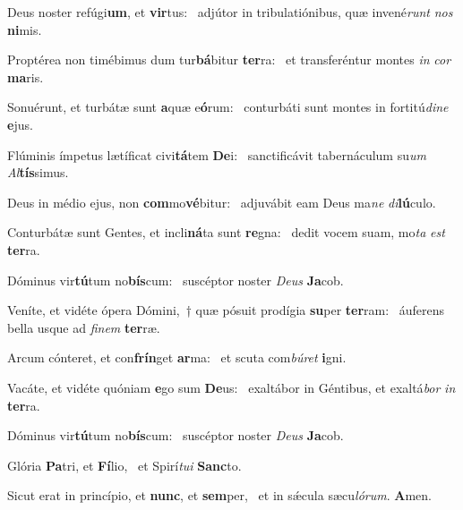 \item Deus noster refúgi\textbf{um}, et \textbf{vir}tus:~\psstar{} adjútor in tribulatiónibus, quæ invené\textit{runt} \textit{nos} \textbf{ni}mis.
\item Proptérea non timébimus dum tur\textbf{bá}bitur \textbf{ter}ra:~\psstar{} et transferéntur montes \textit{in} \textit{cor} \textbf{ma}ris.
\item Sonuérunt, et turbátæ sunt \textbf{a}quæ e\textbf{ó}rum:~\psstar{} conturbáti sunt montes in fortitú\textit{dine} \textbf{e}jus.
\item Flúminis ímpetus lætíficat civi\textbf{tá}tem \textbf{De}i:~\psstar{} sanctificávit tabernáculum su\textit{um} \textit{Al}\textbf{tís}simus.
\item Deus in médio ejus, non \textbf{com}mo\textbf{vé}bitur:~\psstar{} adjuvábit eam Deus ma\textit{ne} \textit{di}\textbf{lú}culo.
\item Conturbátæ sunt Gentes, et incli\textbf{ná}ta sunt \textbf{re}gna:~\psstar{} dedit vocem suam, mo\textit{ta} \textit{est} \textbf{ter}ra.
\item Dóminus vir\textbf{tú}tum no\textbf{bís}cum:~\psstar{} suscéptor noster \textit{Deus} \textbf{Ja}cob.
\item Veníte, et vidéte ópera Dómini,~† quæ pósuit prodígia \textbf{su}per \textbf{ter}ram:~\psstar{} áuferens bella usque ad \textit{finem} \textbf{ter}ræ.
\item Arcum cónteret, et con\textbf{frín}get \textbf{ar}ma:~\psstar{} et scuta com\textit{búret} \textbf{i}gni.
\item Vacáte, et vidéte quóniam \textbf{e}go sum \textbf{De}us:~\psstar{} exaltábor in Géntibus, et exaltá\textit{bor} \textit{in} \textbf{ter}ra.
\item Dóminus vir\textbf{tú}tum no\textbf{bís}cum:~\psstar{} suscéptor noster \textit{Deus} \textbf{Ja}cob.
\item Glória \textbf{Pa}tri, et \textbf{Fí}lio,~\psstar{} et Spirí\textit{tui} \textbf{Sanc}to.
\item Sicut erat in princípio, et \textbf{nunc}, et \textbf{sem}per,~\psstar{} et in sǽcula sæcu\textit{lórum}. \textbf{A}men.
